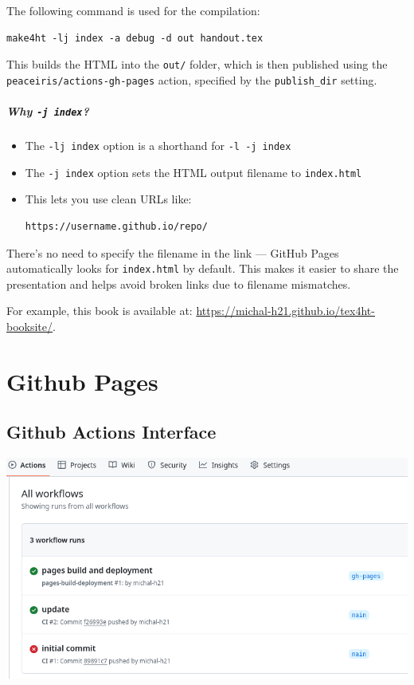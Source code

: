 \documentclass{book}
\begin{document}
The following command is used for the compilation:

\begin{verbatim}
make4ht -lj index -a debug -d out handout.tex
\end{verbatim}


This builds the HTML into the \texttt{out/} folder, which is then published
using the \texttt{peaceiris/actions-gh-pages} action, specified by the
\texttt{publish\_dir} setting.


\paragraph{Why \texttt{-j index}?}
\begin{itemize}
  \item The \texttt{-lj index} option is a shorthand for \texttt{-l -j index}
  \item The \texttt{-j index} option sets the HTML output filename to \texttt{index.html}
  \item This lets you use clean URLs like:
  
\begin{verbatim}
https://username.github.io/repo/
\end{verbatim}

\end{itemize}


There’s no need to specify the filename in the link — GitHub Pages
automatically looks for \texttt{index.html} by default. This makes it easier to share
the presentation and helps avoid broken links due to filename mismatches.

For example, this book is available at: \url{https://michal-h21.github.io/tex4ht-booksite/}.

\chapter{Github Pages}

\section{Github Actions Interface}
\includegraphics[width=\textwidth]{img/github-actions.png}
\end{document}
